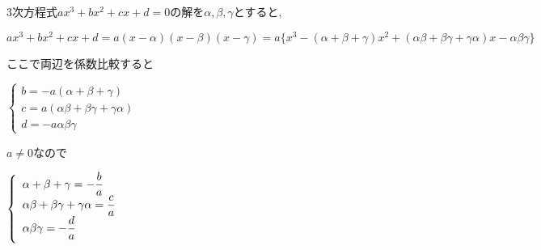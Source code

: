 \documentclass{jsarticle}
\begin{document}
\begin{boxnote}
  [証明]\par
  3次方程式$ax^3+bx^2+cx+d=0$の解を$\alpha,\beta,\gamma$とすると,\par
  $ax^3+bx^2+cx+d = a(x-\alpha)(x-\beta)(x-\gamma)=a\{x^3-(\alpha+\beta+\gamma)x^2+(\alpha\beta+\beta\gamma+\gamma\alpha)x-\alpha\beta\gamma\}$\par
  ここで両辺を係数比較すると\par
  \vspace{2mm}
   $\left\{\begin{array}{lll}
     b=-a(\alpha+\beta+\gamma)\\
     c=a(\alpha\beta+\beta\gamma+\gamma\alpha)\\
     d=-a\alpha\beta\gamma
  \end{array}\right.$\par
  \vspace{2mm}
  $a\not=0$なので\par
  \vspace{2mm}
  $\left\{\begin{array}{lll}
     \alpha+\beta+\gamma=-\dfrac{b}{a}\\
     \alpha\beta+\beta\gamma+\gamma\alpha=\dfrac{c}{a}\\
     \alpha\beta\gamma=-\dfrac{d}{a}
     \vspace{2mm}
  \end{array}\right.$ \qquad\qquad[終]\par
\end{boxnote}
\end{document}
